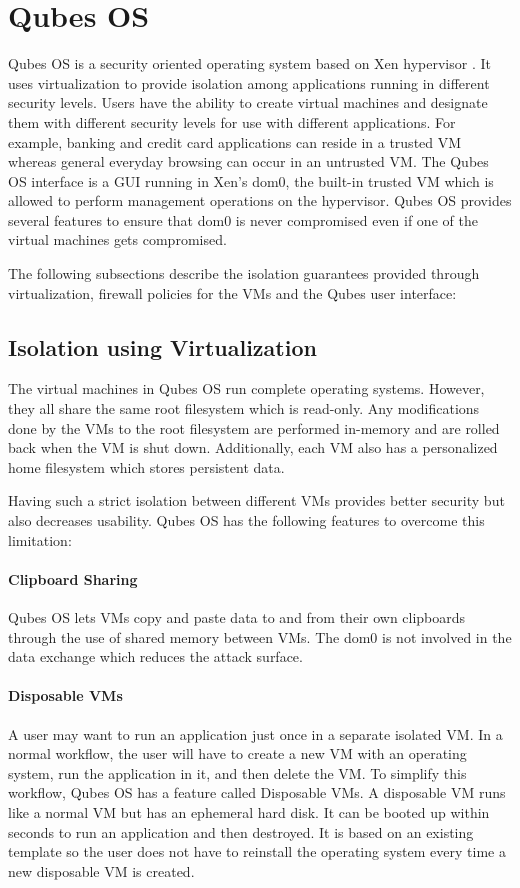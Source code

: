 \section{Qubes OS} \label{section-qubes-os}

Qubes OS is a security oriented operating system based on Xen hypervisor \cite{xen}. It uses virtualization to provide isolation among applications running in different security levels. Users have the ability to create virtual machines and designate them with different security levels for use with different applications. For example, banking and credit card applications can reside in a trusted VM whereas general everyday browsing can occur in an untrusted VM. The Qubes OS interface is a GUI running in Xen's dom0, the built-in trusted VM which is allowed to perform management operations on the hypervisor. Qubes OS provides several features to ensure that dom0 is never compromised even if one of the virtual machines gets compromised.

The following subsections describe the isolation guarantees provided through virtualization, firewall policies for the VMs and the Qubes user interface:

\subsection{Isolation using Virtualization}

The virtual machines in Qubes OS run complete operating systems. However, they all share the same root filesystem which is read-only. Any modifications done by the VMs to the root filesystem are performed in-memory and are rolled back when the VM is shut down. Additionally, each VM also has a personalized home filesystem which stores persistent data.

Having such a strict isolation between different VMs provides better security but also decreases usability. Qubes OS has the following features to overcome this limitation:

\paragraph{Clipboard Sharing} Qubes OS lets VMs copy and paste data to and from their own clipboards through the use of shared memory between VMs. The dom0 is not involved in the data exchange which reduces the attack surface.

\paragraph{Disposable VMs} A user may want to run an application just once in a separate isolated VM. In a normal workflow, the user will have to create a new VM with an operating system, run the application in it, and then delete the VM. To simplify this workflow, Qubes OS has a feature called Disposable VMs. A disposable VM runs like a normal VM but has an ephemeral hard disk. It can be booted up within seconds to run an application and then destroyed. It is based on an existing template so the user does not have to reinstall the operating system every time a new disposable VM is created.

